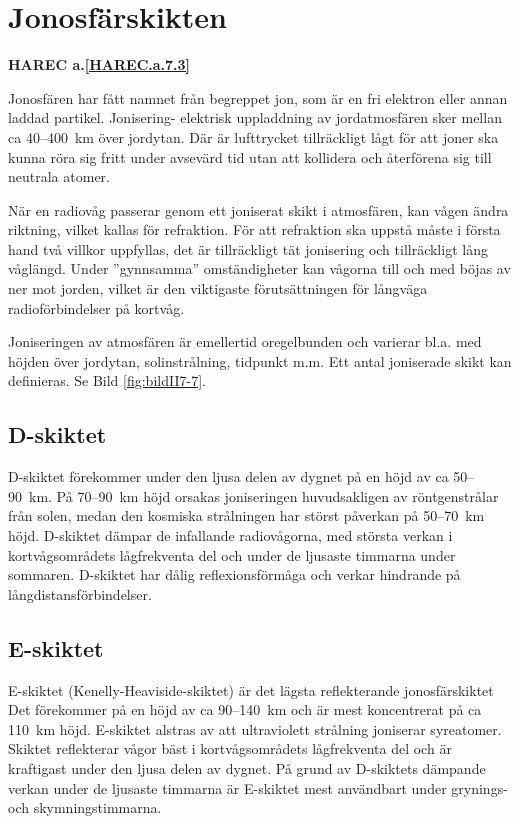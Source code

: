 \section{Jonosfärskikten}
\textbf{
HAREC a.\ref{HAREC.a.7.3}\label{myHAREC.a.7.3}
}

Jonosfären har fått namnet från begreppet jon, som är en fri elektron
eller annan laddad partikel. Jonisering- elektrisk uppladdning av
jordatmosfären sker mellan ca 40--400~km över jordytan. Där är
lufttrycket tillräckligt lågt för att joner ska kunna röra sig fritt
under avsevärd tid utan att kollidera och återförena sig till neutrala
atomer.

När en radiovåg passerar genom ett joniserat skikt i atmosfären,
kan vågen ändra riktning, vilket kallas för refraktion. För att
refraktion ska uppstå måste i första hand två villkor uppfyllas, det
är tillräckligt tät jonisering och tillräckligt lång våglängd. Under
''gynnsamma'' omständigheter kan vågorna till och med böjas av ner mot
jorden, vilket är den viktigaste förutsättningen för långväga
radioförbindelser på kortvåg.

Joniseringen av atmosfären är emellertid oregelbunden och varierar
bl.a. med höjden över jordytan, solinstrålning, tidpunkt m.m.  Ett
antal joniserade skikt kan definieras. Se Bild \ref{fig:bildII7-7}.

\subsection{D-skiktet}

D-skiktet förekommer under den ljusa delen av dygnet på en höjd av ca
50--90~km. På 70--90~km höjd orsakas joniseringen huvudsakligen av
röntgenstrålar från solen, medan den kosmiska strålningen har störst
påverkan på 50--70~km höjd. D-skiktet dämpar de infallande
radiovågorna, med största verkan i kortvågsområdets lågfrekventa del
och under de ljusaste timmarna under sommaren.  D-skiktet har dålig
reflexionsförmåga och verkar hindrande på långdistansförbindelser.

\subsection{E-skiktet}

E-skiktet (Kenelly-Heaviside-skiktet) är det lägsta reflekterande
jonosfärskiktet Det förekommer på en höjd av ca 90--140~km och är mest
koncentrerat på ca 110~km höjd. E-skiktet alstras av att ultraviolett
strålning joniserar syreatomer. Skiktet reflekterar vågor bäst i
kortvågsområdets lågfrekventa del och är kraftigast under den ljusa
delen av dygnet. På grund av D-skiktets dämpande verkan under de
ljusaste timmarna är E-skiktet mest användbart under grynings- och
skymningstimmarna.

